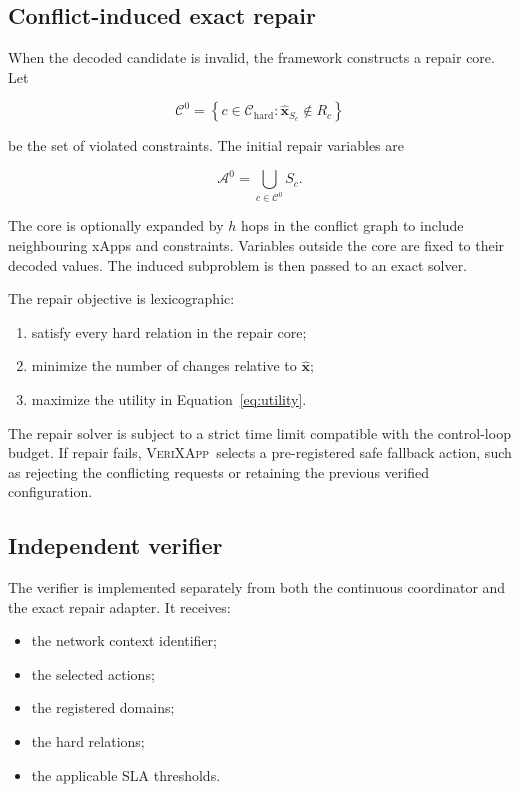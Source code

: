 \documentclass[pdflatex,sn-mathphys-num,iicol,oneside]{sn-jnl}
\newcommand{\method}{\textsc{VeriXApp}}
\begin{document}
\subsection{Conflict-induced exact repair}

When the decoded candidate is invalid, the framework constructs a
repair core. Let

\begin{equation}
\mathcal{C}^{0}
=
\left\{
c\in\mathcal{C}_{\mathrm{hard}}:
\widehat{\bm{x}}_{S_c}\notin R_c
\right\}
\end{equation}

be the set of violated constraints. The initial repair variables are

\begin{equation}
\mathcal{A}^{0}
=
\bigcup_{c\in\mathcal{C}^{0}}S_c.
\end{equation}

The core is optionally expanded by $h$ hops in the conflict graph to
include neighbouring xApps and constraints. Variables outside the
core are fixed to their decoded values. The induced subproblem is
then passed to an exact solver.

The repair objective is lexicographic:

\begin{enumerate}
    \item satisfy every hard relation in the repair core;
    \item minimize the number of changes relative to
    $\widehat{\bm{x}}$;
    \item maximize the utility in
    Equation~\eqref{eq:utility}.
\end{enumerate}

The repair solver is subject to a strict time limit compatible with
the control-loop budget. If repair fails, \method\ selects a
pre-registered safe fallback action, such as rejecting the conflicting
requests or retaining the previous verified configuration.

\subsection{Independent verifier}

The verifier is implemented separately from both the continuous
coordinator and the exact repair adapter. It receives:

\begin{itemize}
    \item the network context identifier;
    \item the selected actions;
    \item the registered domains;
    \item the hard relations;
    \item the applicable SLA thresholds.
\end{itemize}
\end{document}
